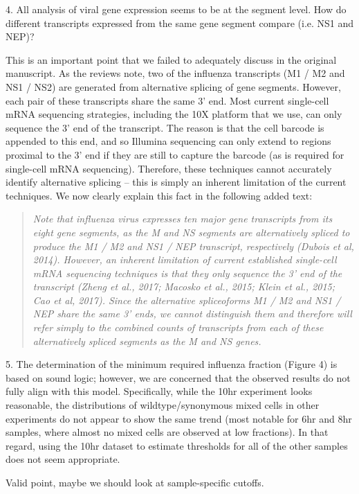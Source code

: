 \documentclass[11pt, oneside]{article}   	%
\begin{document}
4. All analysis of viral gene expression seems to be at the segment level. How do different transcripts expressed from the same gene segment compare (i.e. NS1 and NEP)? 

{\color{black}
This is an important point that we failed to adequately discuss in the original manuscript.
As the reviews note, two of the influenza transcripts (M1 / M2  and NS1 / NS2) are generated from alternative splicing of gene segments.
However, each pair of these transcripts share the same 3' end.
Most current single-cell mRNA sequencing strategies, including the 10X platform that we use, can only sequence the 3' end of the transcript.
The reason is that the cell barcode is appended to this end, and so Illumina sequencing can only extend to regions proximal to the 3' end if they are still to capture the barcode (as is required for single-cell mRNA sequencing).
Therefore, these techniques cannot accurately identify alternative splicing -- this is simply an inherent limitation of the current techniques.
We now clearly explain this fact in the following added text:
\begin{quote}
\textsl{
Note that influenza virus expresses ten major gene transcripts from its eight gene segments, as the M and NS segments are alternatively spliced to produce the M1 / M2 and NS1 / NEP transcript, respectively (Dubois et al, 2014).
However, an inherent limitation of current established single-cell mRNA sequencing techniques is that they only sequence the 3' end of the transcript (Zheng et al., 2017; Macosko et al., 2015; Klein et al., 2015; Cao et al, 2017).
Since the alternative spliceoforms M1 / M2 and NS1 / NEP share the same 3' ends, we cannot distinguish them and therefore will refer simply to the combined counts of transcripts from each of these alternatively spliced segments as the M and NS genes.}
\end{quote}
}

5. The determination of the minimum required influenza fraction (Figure 4) is based on sound logic; however, we are concerned that the observed results do not fully align with this model. Specifically, while the 10hr experiment looks reasonable, the distributions of wildtype/synonymous mixed cells in other experiments do not appear to show the same trend (most notable for 6hr and 8hr samples, where almost no mixed cells are observed at low fractions). In that regard, using the 10hr dataset to estimate thresholds for all of the other samples does not seem appropriate. 

{\color{red}
Valid point, maybe we should look at sample-specific cutoffs.
}
\end{document}
